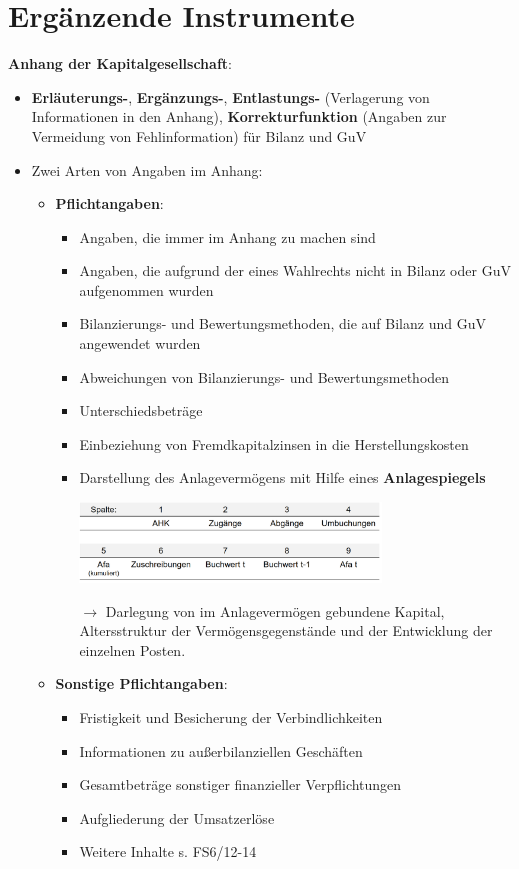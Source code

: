 \section{Ergänzende Instrumente}

\textbf{Anhang der Kapitalgesellschaft}:
\begin{itemize}
	\item \textbf{Erläuterungs-}, \textbf{Ergänzungs-}, \textbf{Entlastungs-} (Verlagerung von Informationen in den Anhang), \textbf{Korrekturfunktion} (Angaben zur Vermeidung von Fehlinformation) für Bilanz und GuV
	\item Zwei Arten von Angaben im Anhang:
	\begin{itemize}
		\item \textbf{Pflichtangaben}:
		\begin{itemize}
			\item Angaben, die immer im Anhang zu machen sind
			\item Angaben, die aufgrund der eines Wahlrechts nicht in Bilanz oder GuV aufgenommen wurden
			\item Bilanzierungs- und Bewertungsmethoden, die auf Bilanz und GuV angewendet wurden
			\item Abweichungen von Bilanzierungs- und Bewertungsmethoden
			\item Unterschiedsbeträge
			\item Einbeziehung von Fremdkapitalzinsen in die Herstellungskosten
			\item Darstellung des Anlagevermögens mit Hilfe eines \textbf{Anlagespiegels}
			\begin{center}
				\includegraphics[width=0.7\textwidth]{images/anmirr.png}
			\end{center}
			$\rightarrow$ Darlegung von im Anlagevermögen gebundene Kapital, Altersstruktur der Vermögensgegenstände und der Entwicklung der einzelnen Posten.
		\end{itemize}
		\item \textbf{Sonstige Pflichtangaben}: 
		\begin{itemize}
			\item Fristigkeit und Besicherung der Verbindlichkeiten
			\item Informationen zu außerbilanziellen Geschäften
			\item Gesamtbeträge sonstiger finanzieller Verpflichtungen
			\item Aufgliederung der Umsatzerlöse
			\item Weitere Inhalte s. FS6/12-14
		\end{itemize}
	\end{itemize}
\end{itemize}

